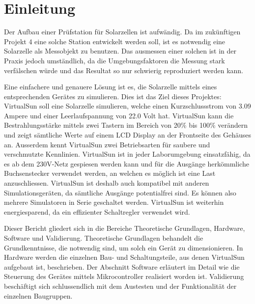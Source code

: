 \section{Einleitung}

Der Aufbau einer Prüfstation für Solarzellen ist aufwändig. Da im zukünftigen Projekt 4 eine solche Station entwickelt werden soll, ist es notwendig eine Solarzelle als Messobjekt zu benutzen. Das ausmessen einer solchen ist in 
der Praxis jedoch umständlich, da die Umgebungsfaktoren die Messung stark verfälschen würde und das Resultat so nur schwierig reproduziert werden kann.


Eine einfachere und genauere Lösung ist es, die Solarzelle mittels eines entsprechenden Gerätes zu simulieren. Dies ist das Ziel dieses Projektes: VirtualSun soll eine Solarzelle simulieren, welche einen Kurzschlussstrom von 3.09 Ampere und einer Leerlaufspannung von 22.0 Volt hat. VirtualSun kann die Bestrahlungsstärke mittels zwei Tastern im Bereich von 20\% bis 100\% verändern und zeigt sämtliche Werte auf einem LCD Display an der Frontseite des Gehäuses an. Ausserdem kennt VirtualSun zwei Betriebsarten für saubere und verschmutzte Kennlinien. VirtualSun ist in jeder Laborumgebung einsatzfähig, da es ab dem 230V-Netz gespiesen werden kann und für die Ausgänge herkömmliche Buchsenstecker verwendet werden, an welchen es möglich ist eine Last anzuschliessen. VirtualSun ist deshalb auch kompatibel mit anderen Simulationsgeräten, da sämtliche Ausgänge potentialfrei sind. Es können also mehrere Simulatoren in Serie geschaltet werden.  VirtualSun ist weiterhin energiesparend, da ein effizienter Schaltregler verwendet wird. 

Dieser Bericht gliedert sich in
die Bereiche Theoretische Grundlagen, Hardware, Software und Validierung. Theoretische Grundlagen behandelt die Grundkenntnisse, die notwendig sind, um solch ein Gerät zu dimensionieren. In Hardware werden die einzelnen Bau- und Schaltungsteile, aus denen VirtualSun aufgebaut ist, beschrieben. Der Abschnitt Software erläutert im Detail wie die Steuerung des Gerätes mittels Mikrocontroller realisiert worden ist. Validierung beschäftigt sich schlussendlich mit dem Austesten und der Funktionalität der einzelnen Baugruppen.